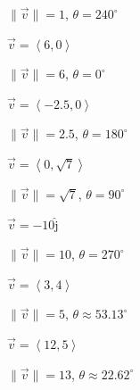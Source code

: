 \documentclass{ximera}
\begin{document}
\begin{question}
\begin{problem}
\begin{solution}
$\|\overrightarrow{v}\| = 1$, $\theta = 240^{\circ}$
\end{solution}
\end{problem}

\begin{problem}
$\overrightarrow{v} = \left<6, 0\right>$

\begin{solution}
$\|\overrightarrow{v}\| = 6$, $\theta = 0^{\circ}$
\end{solution}
\end{problem}

\begin{problem}
$\overrightarrow{v} = \left<-2.5, 0\right>$

\begin{solution}
$\|\overrightarrow{v}\| = 2.5$, $\theta = 180^{\circ}$
\end{solution}
\end{problem}

\begin{problem}
$\overrightarrow{v} = \left<0, \sqrt{7} \right>$

\begin{solution}
$\|\overrightarrow{v}\| = \sqrt{7}$, $\theta = 90^{\circ}$
\end{solution}
\end{problem}

\begin{problem}
$\overrightarrow{v} = -10 \hat{\text{j}}$

\begin{solution}
$\|\overrightarrow{v}\| = 10$, $\theta = 270^{\circ}$
\end{solution}
\end{problem}

\begin{problem}
$\overrightarrow{v} = \left< 3,4\right>$

\begin{solution}
$\|\overrightarrow{v}\| = 5$, $\theta \approx 53.13^{\circ}$
\end{solution}
\end{problem}

\begin{problem}
$\overrightarrow{v} = \left<12, 5\right>$

\begin{solution}
$\|\overrightarrow{v}\| = 13$, $\theta \approx 22.62^{\circ}$
\end{solution}
\end{problem}


\end{question}
\end{document}
